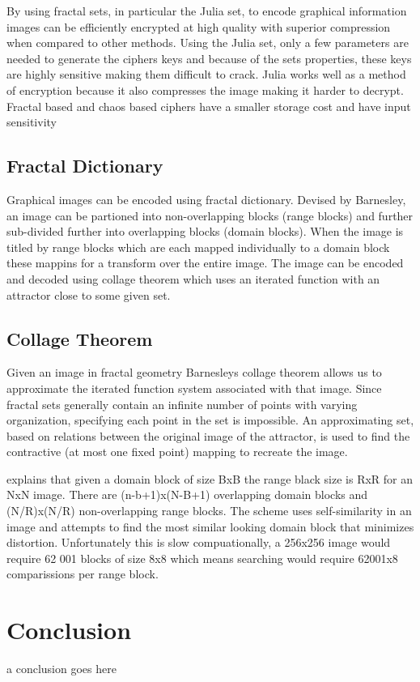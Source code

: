 \documentclass[12pt]{article}
\begin{document}
By using fractal sets, in particular the Julia set, to encode graphical information images can be efficiently encrypted at high quality with superior compression when compared to other methods.\cite{cotty} Using the Julia set, only a few parameters are needed to generate the ciphers keys \cite{algo} and because of the sets properties, these keys are highly sensitive making them difficult to crack. Julia works well as a method of encryption because it also compresses the image \cite{china} making it harder to decrypt. Fractal based and chaos based ciphers have a smaller storage cost and have input sensitivity \cite{china}


\subsection{Fractal Dictionary}

Graphical images can be encoded using fractal dictionary.\cite{china} Devised by Barnesley, an image can be partioned into non-overlapping blocks (range blocks) and  further sub-divided further into overlapping blocks (domain blocks). When the image is titled by range blocks which are each mapped individually to a domain block these mappins for a transform over the entire image. The image can be encoded and decoded using collage theorem\cite{iraq} which uses an iterated function with an attractor close to some given set.


\subsection{Collage Theorem}
Given an image in fractal geometry  Barnesleys collage theorem allows us to approximate the iterated function system associated with that image.\cite{iraq} Since fractal sets generally contain an infinite number of points with varying organization, specifying each point in the set is impossible. \cite{ifs}An approximating set, based on  relations between the original image of the attractor, is used to find the contractive (at most one fixed point) mapping to recreate the image. 

\cite{china} explains that given a domain block of size BxB the range black size is RxR for an NxN image. There are (n-b+1)x(N-B+1) overlapping domain blocks and (N/R)x(N/R)  non-overlapping range blocks. The scheme uses self-similarity in an image and attempts to find the most similar looking domain block that minimizes distortion. Unfortunately this is slow compuationally, a 256x256 image would require 62 001 blocks of size 8x8 which means searching would require 62001x8 comparissions per range block. 

\section{Conclusion}
a conclusion goes here
\newpage


\end{document}

